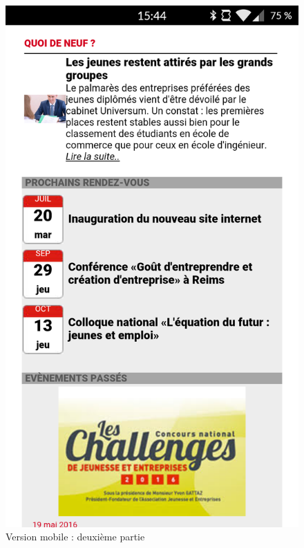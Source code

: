 \documentclass[report]{tnreport}
\begin{document}
\begin{figure}[!htb]
  \includegraphics[width=\linewidth]{figures/aje_mobile2}
  \caption{Version mobile : deuxième partie}\label{fig:aje_mobile2}
\endminipage\hfill
{}%

\end{figure}
\end{document}
